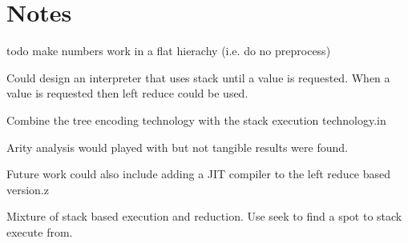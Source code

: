 \chapter{Notes}\label{C:notes}


todo make numbers work in a flat hierachy  (i.e. do no preprocess)

Could design an interpreter that uses stack until a value is requested. When a
value is requested then left reduce could be used.

Combine the tree encoding technology with the stack execution technology.in

Arity analysis would played with but not tangible results were found.

Future work could also include adding a JIT compiler to the left reduce based version.z


Mixture of stack based execution and reduction.
Use seek to find a spot to stack execute from.